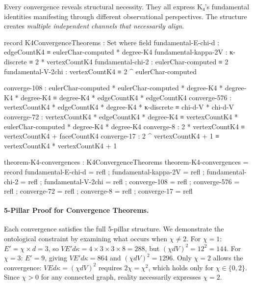 \documentclass[11pt,a4paper]{book}
\begin{document}
Every convergence reveals structural necessity. They all express
K₄'s fundamental identities manifesting through different observational perspectives. The structure creates 
\emph{multiple independent channels that necessarily align}.

\begin{code}
record K4ConvergenceTheorems : Set where
  field
    fundamental-E-chi-d   : edgeCountK4 ≡ eulerChar-computed * degree-K4
    fundamental-kappa-2V  : κ-discrete ≡ 2 * vertexCountK4
    fundamental-chi-2     : eulerChar-computed ≡ 2
    fundamental-V-2chi    : vertexCountK4 ≡ 2 ^ eulerChar-computed
    
    converge-108 : eulerChar-computed * eulerChar-computed * degree-K4 * degree-K4 * degree-K4 
                 ≡ degree-K4 * edgeCountK4 * edgeCountK4
    converge-576 : vertexCountK4 * edgeCountK4 * degree-K4 * κ-discrete 
                 ≡ chi-d-V * chi-d-V
    converge-72  : vertexCountK4 * edgeCountK4 * degree-K4 
                 ≡ vertexCountK4 * eulerChar-computed * degree-K4 * degree-K4
    converge-8   : 2 * vertexCountK4 ≡ vertexCountK4 + faceCountK4
    converge-17  : 2 ^ vertexCountK4 + 1 ≡ vertexCountK4 * vertexCountK4 + 1

theorem-K4-convergences : K4ConvergenceTheorems
theorem-K4-convergences = record
  { fundamental-E-chi-d  = refl
  ; fundamental-kappa-2V = refl
  ; fundamental-chi-2    = refl
  ; fundamental-V-2chi   = refl
  ; converge-108 = refl
  ; converge-576 = refl
  ; converge-72  = refl
  ; converge-8   = refl
  ; converge-17  = refl
  }
\end{code}

\paragraph{5-Pillar Proof for Convergence Theorems.}

Each convergence satisfies the full 5-pillar structure. We demonstrate the ontological constraint by examining what occurs when $\chi \neq 2$. For $\chi = 1$: $E' = \chi \times d = 3$, so $V E' d \kappa = 4 \times 3 \times 3 \times 8 = 288$, but $(\chi d V)^2 = 12^2 = 144$. For $\chi = 3$: $E' = 9$, giving $V E' d \kappa = 864$ and $(\chi d V)^2 = 1296$. Only $\chi = 2$ allows the convergence: $VEd\kappa = (\chi dV)^2$ requires $2\chi = \chi^2$, which holds only for $\chi \in \{0, 2\}$. Since $\chi > 0$ for any connected graph, reality necessarily expresses $\chi = 2$.
\end{document}
